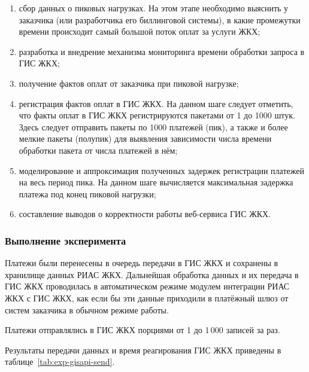 \begin{enumerate}
	\item сбор данных о пиковых нагрузках. На этом этапе необходимо выяснить у заказчика (или разработчика его биллинговой системы), в какие промежутки времени происходит самый большой поток оплат за услуги ЖКХ;
	\item разработка и внедрение механизма мониторинга времени обработки запроса в ГИС ЖКХ;
	\item получение фактов оплат от заказчика при пиковой нагрузке;
	\item регистрация фактов оплат в ГИС ЖКХ. На данном шаге следует отметить, что факты оплат в ГИС ЖКХ регистрируются пакетами от 1 до 1000 штук. Здесь следует отправить пакеты по 1000 платежей (пик), а также и более мелкие пакеты (полупик) для выявления зависимости числа времени обработки пакета от числа платежей в нём;
	\item моделирование и аппроксимация полученных задержек регистрации платежей на весь период пика. На данном шаге вычисляется максимальная задержка платежа под конец пиковой нагрузки;
	\item составление выводов о корректности работы веб-сервиса ГИС ЖКХ.
\end{enumerate}

\subsubsection*{Выполнение эксперимента}

Платежи были перенесены в очередь передачи в ГИС ЖКХ и сохранены в хранилище данных РИАС ЖКХ.
Дальнейшая обработка данных и их передача в ГИС ЖКХ проводилась в автоматическом режиме модулем интеграции РИАС ЖКХ с ГИС ЖКХ, как если бы эти данные приходили в платёжный шлюз от систем заказчика в обычном режиме работы.

Платежи отправлялись в ГИС ЖКХ порциями от 1 до 1\,000 записей за раз. 

Результаты передачи данных и время реагирования ГИС ЖКХ приведены в таблице~\ref{tab:exp-gisapi-send}.


